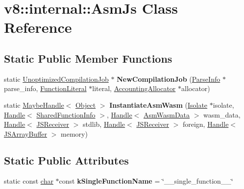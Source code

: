 \hypertarget{classv8_1_1internal_1_1AsmJs}{}\section{v8\+:\+:internal\+:\+:Asm\+Js Class Reference}
\label{classv8_1_1internal_1_1AsmJs}
\subsection*{Static Public Member Functions}
\begin{DoxyCompactItemize}
\item 
\mbox{\label{classv8_1_1internal_1_1AsmJs_a8a5bf6aaed74c2e8173ac8710a62dc02}} 
static \mbox{\hyperlink{classv8_1_1internal_1_1UnoptimizedCompilationJob}{Unoptimized\+Compilation\+Job}} $\ast$ {\bfseries New\+Compilation\+Job} (\mbox{\hyperlink{classv8_1_1internal_1_1ParseInfo}{Parse\+Info}} $\ast$parse\+\_\+info, \mbox{\hyperlink{classv8_1_1internal_1_1FunctionLiteral}{Function\+Literal}} $\ast$literal, \mbox{\hyperlink{classv8_1_1internal_1_1AccountingAllocator}{Accounting\+Allocator}} $\ast$allocator)
\item 
\mbox{\label{classv8_1_1internal_1_1AsmJs_ae9a0278103034baf332701b5e2fec42c}} 
static \mbox{\hyperlink{classv8_1_1internal_1_1MaybeHandle}{Maybe\+Handle}}$<$ \mbox{\hyperlink{classv8_1_1internal_1_1Object}{Object}} $>$ {\bfseries Instantiate\+Asm\+Wasm} (\mbox{\hyperlink{classv8_1_1internal_1_1Isolate}{Isolate}} $\ast$isolate, \mbox{\hyperlink{classv8_1_1internal_1_1Handle}{Handle}}$<$ \mbox{\hyperlink{classv8_1_1internal_1_1SharedFunctionInfo}{Shared\+Function\+Info}} $>$, \mbox{\hyperlink{classv8_1_1internal_1_1Handle}{Handle}}$<$ \mbox{\hyperlink{classv8_1_1internal_1_1AsmWasmData}{Asm\+Wasm\+Data}} $>$ wasm\+\_\+data, \mbox{\hyperlink{classv8_1_1internal_1_1Handle}{Handle}}$<$ \mbox{\hyperlink{classv8_1_1internal_1_1JSReceiver}{J\+S\+Receiver}} $>$ stdlib, \mbox{\hyperlink{classv8_1_1internal_1_1Handle}{Handle}}$<$ \mbox{\hyperlink{classv8_1_1internal_1_1JSReceiver}{J\+S\+Receiver}} $>$ foreign, \mbox{\hyperlink{classv8_1_1internal_1_1Handle}{Handle}}$<$ \mbox{\hyperlink{classv8_1_1internal_1_1JSArrayBuffer}{J\+S\+Array\+Buffer}} $>$ memory)
\end{DoxyCompactItemize}
\subsection*{Static Public Attributes}
\begin{DoxyCompactItemize}
\item 
\mbox{\label{classv8_1_1internal_1_1AsmJs_a27360cb0c921f0626fd84494b87e79af}} 
static const \mbox{\hyperlink{classchar}{char}} $\ast$const {\bfseries k\+Single\+Function\+Name} = \char`\"{}\+\_\+\+\_\+single\+\_\+function\+\_\+\+\_\+\char`\"{}
\end{DoxyCompactItemize}


